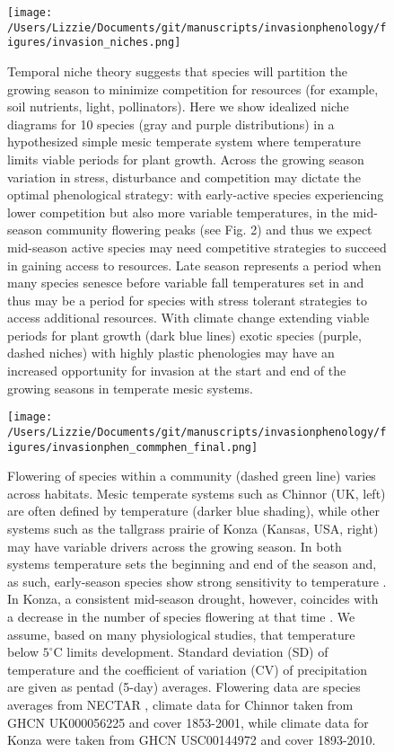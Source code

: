 \documentclass[11pt,a4paper,oneside]{article}
\begin{document}
\newpage
\begin{figure}[h!]
\centering
\noindent \texttt{[image: /Users/Lizzie/Documents/git/manuscripts/invasionphenology/figures/invasion\_niches.png]}
\caption{Temporal niche theory suggests that species will partition the growing season to minimize competition for resources (for example, soil nutrients, light, pollinators). Here we show idealized niche diagrams for 10 species (gray and purple distributions) in a hypothesized simple mesic temperate system where temperature limits viable periods for plant growth. Across the growing season variation in stress, disturbance and competition may dictate the optimal phenological strategy: with early-active species experiencing lower competition but also more variable temperatures, in the mid-season community flowering peaks (see Fig. 2) and thus we expect mid-season active species may need competitive strategies to succeed in gaining access to resources. Late season represents a period when many species senesce before variable fall temperatures set in and thus may be a period for species with stress tolerant strategies to access additional resources. With climate change extending viable periods for plant growth (dark blue lines) exotic species (purple, dashed niches) with highly plastic phenologies may have an increased opportunity for invasion at the start and end of the growing seasons in temperate mesic systems.}
\end{figure}

\newpage
\begin{figure}[h!]
\centering
\noindent \texttt{[image: /Users/Lizzie/Documents/git/manuscripts/invasionphenology/figures/invasionphen\_commphen\_final.png]}
\caption{Flowering of species within a community (dashed green line) varies across habitats. Mesic temperate systems such as Chinnor (UK, left) are often defined by temperature (darker blue shading), while other systems such as the tallgrass prairie of Konza (Kansas, USA, right) may have variable drivers across the growing season. In both systems temperature sets the beginning and end of the season and, as such, early-season species show strong sensitivity to temperature \citep{Cook:2012,Craine:2012kl}. In Konza, a consistent mid-season drought, however, coincides with a decrease in the number of species flowering at that time \citep{Craine:2012kl}. We assume, based on many physiological studies, that temperature below \(5^{\circ}\mathrm{C}\) limits development. Standard deviation (SD) of temperature and the coefficient of variation (CV) of precipitation are given as pentad (5-day) averages. Flowering data are species averages from NECTAR \citep{nectar}, climate data for Chinnor taken from GHCN UK000056225 and cover 1853-2001, while climate data for Konza were taken from GHCN USC00144972 and cover 1893-2010.}
\end{figure}
\end{document}
